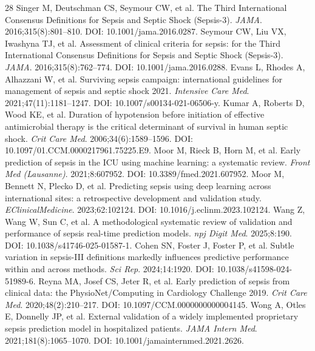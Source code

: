 \documentclass[12pt,a4paper]{article}
\begin{document}
\begin{singlespace}
\clearpage
\begin{thebibliography}{28}
\fontsize{7.5pt}{10.0pt}\selectfont
\setlength{\itemsep}{1pt}
\setlength{\parsep}{0pt}
\setlength{\parskip}{0pt}
 Singer M, Deutschman CS, Seymour CW, et al. The Third International Consensus Definitions for Sepsis and Septic Shock (Sepsis-3). \textit{JAMA}. 2016;315(8):801--810. DOI: 10.1001/jama.2016.0287.
 Seymour CW, Liu VX, Iwashyna TJ, et al. Assessment of clinical criteria for sepsis: for the Third International Consensus Definitions for Sepsis and Septic Shock (Sepsis-3). \textit{JAMA}. 2016;315(8):762--774. DOI: 10.1001/jama.2016.0288.
 Evans L, Rhodes A, Alhazzani W, et al. Surviving sepsis campaign: international guidelines for management of sepsis and septic shock 2021. \textit{Intensive Care Med}. 2021;47(11):1181--1247. DOI: 10.1007/s00134-021-06506-y.
 Kumar A, Roberts D, Wood KE, et al. Duration of hypotension before initiation of effective antimicrobial therapy is the critical determinant of survival in human septic shock. \textit{Crit Care Med}. 2006;34(6):1589--1596. DOI: 10.1097/01.CCM.0000217961.75225.E9.
 Moor M, Rieck B, Horn M, et al. Early prediction of sepsis in the ICU using machine learning: a systematic review. \textit{Front Med (Lausanne)}. 2021;8:607952. DOI: 10.3389/fmed.2021.607952.
 Moor M, Bennett N, Plecko D, et al. Predicting sepsis using deep learning across international sites: a retrospective development and validation study. \textit{EClinicalMedicine}. 2023;62:102124. DOI: 10.1016/j.eclinm.2023.102124.
 Wang Z, Wang W, Sun C, et al. A methodological systematic review of validation and performance of sepsis real-time prediction models. \textit{npj Digit Med}. 2025;8:190. DOI: 10.1038/s41746-025-01587-1.
 Cohen SN, Foster J, Foster P, et al. Subtle variation in sepsis-III definitions markedly influences predictive performance within and across methods. \textit{Sci Rep}. 2024;14:1920. DOI: 10.1038/s41598-024-51989-6.
 Reyna MA, Josef CS, Jeter R, et al. Early prediction of sepsis from clinical data: the PhysioNet/Computing in Cardiology Challenge 2019. \textit{Crit Care Med}. 2020;48(2):210--217. DOI: 10.1097/CCM.0000000000004145.
 Wong A, Otles E, Donnelly JP, et al. External validation of a widely implemented proprietary sepsis prediction model in hospitalized patients. \textit{JAMA Intern Med}. 2021;181(8):1065--1070. DOI: 10.1001/jamainternmed.2021.2626.

\end{thebibliography}
\end{singlespace}
\end{document}
